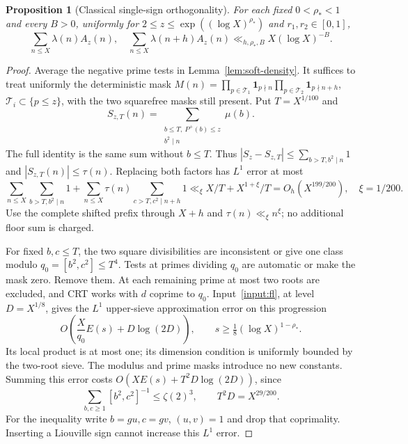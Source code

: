 \documentclass[11pt]{article}
\newtheorem{proposition}[theorem]{Proposition}
\theoremstyle{definition}
\newcommand{\ind}{\mathbf 1}
\theoremstyle{remark}
\numberwithin{equation}{section}
\begin{document}
\begin{proposition}[Classical single-sign orthogonality]\label{prop:soft-single}
For each fixed $0<\rho_*<1$ and every $B>0$, uniformly for
$2\le z\le\exp((\log X)^{\rho_*})$ and $r_1,r_2\in[0,1]$,
\begin{equation}\label{eq:soft-single-cancel}
 \sum_{n\le X}\lambda(n)A_z(n),\quad\sum_{n\le X}\lambda(n+h)A_z(n)
 \ll_{h,\rho_*,B}X(\log X)^{-B}.
\end{equation}
\end{proposition}
\begin{proof}
Average the negative prime tests in Lemma~\ref{lem:soft-density}. It suffices to treat uniformly the deterministic mask
$M(n)=\prod_{p\in\mathcal T_1}\ind_{p\nmid n}\prod_{p\in\mathcal T_2}\ind_{p\nmid n+h}$,
$\mathcal T_i\subset\{p\le z\}$, with the two squarefree masks still present.
Put $T=X^{1/100}$ and
\begin{equation}\label{eq:square-truncation}
 S_{z,T}(n)=\sum_{\substack{b\le T,\ P^+(b)\le z\\b^2\mid n}}\mu(b).
\end{equation}
The full identity is the same sum without $b\le T$.
Thus $|S_z-S_{z,T}|\le\sum_{b>T,b^2\mid n}1$ and $|S_{z,T}(n)|\le\tau(n)$.
Replacing both factors has $L^1$ error at most
\begin{equation}\label{eq:square-truncation-error}
 \sum_{n\le X}\sum_{b>T,b^2\mid n}1+
 \sum_{n\le X}\tau(n)\sum_{c>T,c^2\mid n+h}1
 \ll_\xi X/T+X^{1+\xi}/T=O_h(X^{199/200}),\quad \xi=1/200.
\end{equation}
Use the complete shifted prefix through $X+h$ and $\tau(n)\ll_\xi n^\xi$; no additional floor sum is charged.

For fixed $b,c\le T$, the two square divisibilities are inconsistent or give one class modulo
$q_0=[b^2,c^2]\le T^4$.
Tests at primes dividing $q_0$ are automatic or make the mask zero. Remove them.
At each remaining prime at most two roots are excluded, and CRT works with $d$ coprime to $q_0$.
Input~\ref{input:fl}, at level $D=X^{1/8}$, gives the $L^1$ upper-sieve approximation error on this progression
\begin{equation}\label{eq:soft-sieve-error}
 O\left(\frac X{q_0}E(s)+D\log(2D)\right),\qquad
 s\ge\tfrac18(\log X)^{1-\rho_*}.
\end{equation}
Its local product is at most one; its dimension condition is uniformly bounded by the two-root sieve.
The modulus and prime masks introduce no new constants. Summing this error costs
$O(XE(s)+T^2D\log(2D))$, since
\begin{equation}\label{eq:square-lcm}
 \sum_{b,c\ge1}[b^2,c^2]^{-1}\le\zeta(2)^3,
 \qquad T^2D=X^{29/200}.
\end{equation}
For the inequality write $b=gu,c=gv$, $(u,v)=1$ and drop that coprimality.
Inserting a Liouville sign cannot increase this $L^1$ error.


\end{proof}
\end{document}
